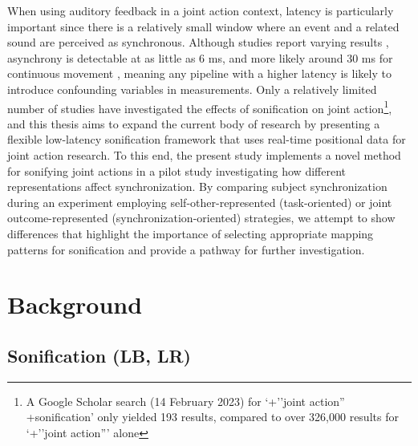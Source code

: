 \documentclass[10pt,a4paper,onecolumn]{article}
\begin{document}
When using auditory feedback in a joint action context, latency is particularly important since there is a relatively small window where an event and a related sound are perceived as synchronous. Although studies report varying results \autocite{keetels2012perception}, asynchrony is detectable at as little as 6 ms, and more likely around 30 ms for continuous movement \autocite{mcphersonActionSoundLatencyAre2016}, meaning any pipeline with a higher latency is likely to introduce confounding variables in measurements. Only a relatively limited number of studies have investigated the effects of sonification on joint action\footnote{A Google Scholar search (14 February 2023) for `+''joint action'' +sonification' only yielded 193 results, compared to over 326,000 results for `+''joint action''' alone}, and this thesis aims to expand the current body of research by presenting a flexible low-latency sonification framework that uses real-time positional data for joint action research. To this end, the present study implements a novel method for sonifying joint actions in a pilot study investigating how different representations affect synchronization. By comparing subject synchronization during an experiment employing self-other-represented (task-oriented) or joint outcome-represented (synchronization-oriented) strategies, we attempt to show differences that highlight the importance of selecting appropriate mapping patterns for sonification and provide a pathway for further investigation.

\hypertarget{background}{%
\section{Background}\label{background}}

\hypertarget{sonification-lb-lr}{%
\subsection{Sonification (LB, LR)}\label{sonification-lb-lr}}
\end{document}

